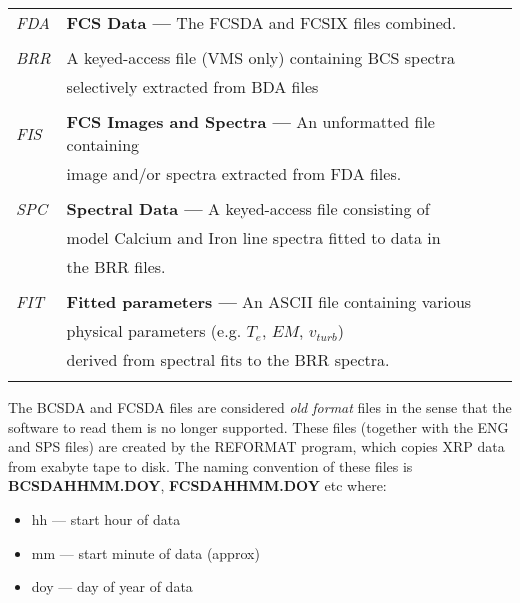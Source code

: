 \begin{center}
\begin{tabular}{||l l||}
 {\em FDA} & {\bf FCS Data ---} The FCSDA and FCSIX files combined. \\
                         &                             \\

 {\em BRR} &    A keyed-access file (VMS only) containing BCS spectra \\
                         &  selectively extracted from BDA files \\
                         &  \\

 {\em FIS} & {\bf FCS Images and Spectra ---} An unformatted file containing \\
                         & image and/or spectra extracted from FDA files.\\
                         &                             \\

 {\em SPC} & {\bf Spectral Data ---} A keyed-access file consisting of\\
                         & model Calcium and Iron line spectra fitted to data in\\
                         & the BRR files. \\
                         &                             \\

 {\em FIT} & {\bf Fitted parameters ---} An ASCII file containing various \\     
                        & physical parameters (e.g. $T_e$, $EM$, $v_{turb}$) \\
                         & derived from spectral fits to the BRR spectra. \\
                         &                             \\         
\hline                                                                         
\end{tabular}
\end{center}

\newpage

The BCSDA and FCSDA files are considered {\it old format} files in the sense
that the software to read them is no longer supported. These files (together
with the ENG and SPS files)  are created by the REFORMAT program, which copies 
XRP data from exabyte tape to disk.  The naming convention of these files is
{\bf BCSDAHHMM.DOY}, {\bf FCSDAHHMM.DOY} etc where:

\begin{itemize}
\item     hh  --- start hour of data
\item     mm  --- start minute of data (approx)
\item     doy --- day of year of data
\end{itemize}   


